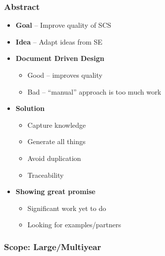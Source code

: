 \documentclass[t,12pt,numbers,fleqn]{beamer}
\begin{document}
\begin{frame}

\frametitle{Abstract}

\begin{itemize}
\item \textbf{Goal} -- Improve quality of SCS
\item \textbf{Idea} -- Adapt ideas from SE
\item \textbf{Document Driven Design}
\begin{itemize}
\item Good -- improves quality
\item Bad -- ``manual'' approach is too much work
\end{itemize}
\item \textbf{Solution}
\begin{itemize}
\item Capture knowledge
\item Generate all things
\item Avoid duplication
\item Traceability
\end{itemize}
\item \textbf{Showing great promise}
\begin{itemize}
\item Significant work yet to do
\item Looking for examples/partners
\end{itemize}
\end{itemize}

\end{frame}




\begin{frame}

\frametitle{Scope: Large/Multiyear} %


\end{frame}
\hoffset=0in
\end{document}

